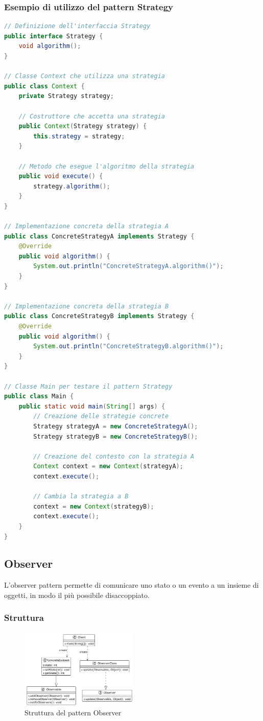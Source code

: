 \documentclass[11pt]{article}
\begin{document}
\subsubsection{Esempio di utilizzo del pattern Strategy}
\begin{lstlisting}[language=Java]
 // Definizione dell'interfaccia Strategy
public interface Strategy {
    void algorithm();
}

// Classe Context che utilizza una strategia
public class Context {
    private Strategy strategy;

    // Costruttore che accetta una strategia
    public Context(Strategy strategy) {
        this.strategy = strategy;
    }

    // Metodo che esegue l'algoritmo della strategia
    public void execute() {
        strategy.algorithm();
    }
}

// Implementazione concreta della strategia A
public class ConcreteStrategyA implements Strategy {
    @Override
    public void algorithm() {
        System.out.println("ConcreteStrategyA.algorithm()");
    }
}

// Implementazione concreta della strategia B
public class ConcreteStrategyB implements Strategy {
    @Override
    public void algorithm() {
        System.out.println("ConcreteStrategyB.algorithm()");
    }
}

// Classe Main per testare il pattern Strategy
public class Main {
    public static void main(String[] args) {
        // Creazione delle strategie concrete
        Strategy strategyA = new ConcreteStrategyA();
        Strategy strategyB = new ConcreteStrategyB();

        // Creazione del contesto con la strategia A
        Context context = new Context(strategyA);
        context.execute();

        // Cambia la strategia a B
        context = new Context(strategyB);
        context.execute();
    }
}
\end{lstlisting}
\subsection{Observer}
L'observer pattern permette di comunicare uno stato o un evento a un insieme di oggetti, in modo il più possibile disaccoppiato.
        \subsubsection{Struttura}
            \begin{figure}[H]
                \centering
                \includegraphics[width=0.5\textwidth]{ObserverUML}
                \caption{Struttura del pattern Observer}
            \end{figure}
\end{document}
